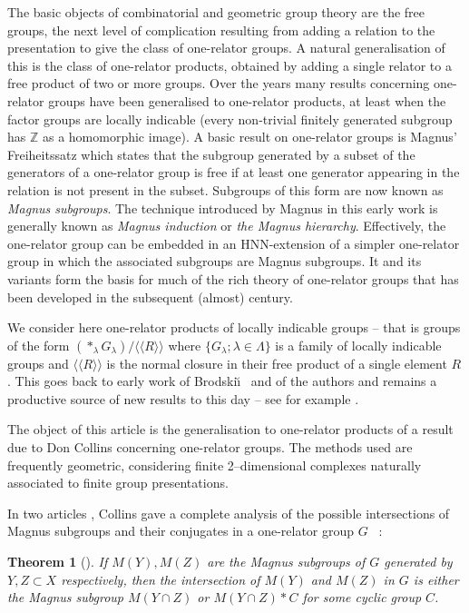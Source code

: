 \documentclass[12pt,a4paper]{amsart}
\def\Z{\mathbb{Z}}
\def\<{\langle}
\def\>{\rangle}
\newtheorem{thm}{Theorem}[section]
\begin{document}
 The basic objects of combinatorial and geometric group theory are the free groups, the next
	level of complication resulting from adding a relation to the presentation to give the class of one-relator groups.
	A natural generalisation of this is 
	the class of one-relator products, obtained by adding a single relator to a free
	product of two or more groups. Over the years many results concerning one-relator groups have been generalised to one-relator
	products, at least when the factor groups are locally indicable 
	(every non-trivial finitely generated subgroup has $\Z$ as a homomorphic image).
	A basic result on one-relator groups is Magnus' Freiheitssatz \cite{M1} which states that the subgroup generated by a subset of the generators of a one-relator group is free if at least one generator appearing in the relation is not present in the subset. 
Subgroups of this form are now known as {\em Magnus subgroups}. 
The technique introduced by Magnus in this early work is generally known as {\em Magnus induction} or {\em the Magnus hierarchy}.  
Effectively, the one-relator group can be embedded in an HNN-extension of a simpler one-relator group in which the associated subgroups are Magnus subgroups.  
It and its variants form the basis for much of the rich theory of one-relator groups that has been developed in the subsequent (almost) century. 

 We consider here one-relator products of locally indicable groups -- that is 
 groups of the form $(*_\lambda G_\lambda)/\<\<R\>\>$ where $\{G_\lambda;\lambda\in\Lambda\}$ is a family of locally indicable groups and $\<\<R\>\>$ is the normal closure in their free product of a single element $R$.   This goes back to early work of Brodski\u\i\ \cite{B80,B81} and of the authors \cite{H81,S81} and remains a productive source of new results to this day -- see for example \cite{HS}. 

	The object of this article is the generalisation to one-relator products of a result due to Don Collins concerning one-relator groups. The methods used are frequently geometric, considering finite 2--dimensional complexes naturally associated to finite group presentations.
	

In two articles \cite{C1,C2}, Collins gave a complete analysis of the possible intersections of Magnus subgroups and their conjugates in a one-relator group $G$ \ :

\begin{thm}[\cite{C1}]\label{Co1}
	If $M(Y),M(Z)$ are the Magnus subgroups of $G$ generated by $Y,Z\subset X$ respectively, then the intersection of $M(Y)$ and $M(Z)$ in $G$ is either the Magnus subgroup $M(Y\cap Z)$ or $M(Y\cap Z)*C$ for some cyclic group $C$.
\end{thm}
\end{document}

